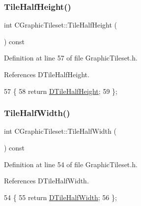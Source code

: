 \hypertarget{classCGraphicTileset_a958562733d2ac30643188503e774af32}{}\label{classCGraphicTileset_a958562733d2ac30643188503e774af32} 
\subsubsection{\texorpdfstring{Tile\+Half\+Height()}{TileHalfHeight()}}
{\footnotesize\ttfamily int C\+Graphic\+Tileset\+::\+Tile\+Half\+Height (\begin{DoxyParamCaption}{ }\end{DoxyParamCaption}) const\hspace{0.3cm}{\ttfamily [inline]}}



Definition at line 57 of file Graphic\+Tileset.\+h.



References D\+Tile\+Half\+Height.


\begin{DoxyCode}
57                                   \{
58             \textcolor{keywordflow}{return} \hyperlink{classCGraphicTileset_a16c8bc4e4c8738fe561b0408cd40ccef}{DTileHalfHeight};
59         \};
\end{DoxyCode}
\hypertarget{classCGraphicTileset_aa34a25f396f9684aebc5f73c45356ea5}{}\label{classCGraphicTileset_aa34a25f396f9684aebc5f73c45356ea5} 
\subsubsection{\texorpdfstring{Tile\+Half\+Width()}{TileHalfWidth()}}
{\footnotesize\ttfamily int C\+Graphic\+Tileset\+::\+Tile\+Half\+Width (\begin{DoxyParamCaption}{ }\end{DoxyParamCaption}) const\hspace{0.3cm}{\ttfamily [inline]}}



Definition at line 54 of file Graphic\+Tileset.\+h.



References D\+Tile\+Half\+Width.


\begin{DoxyCode}
54                                  \{
55             \textcolor{keywordflow}{return} \hyperlink{classCGraphicTileset_a3e82808009078ce29f6b74bcd077b251}{DTileHalfWidth};
56         \};
\end{DoxyCode}
\hypertarget{classCGraphicTileset_a42aa03d1183ea881ce9d7b5545b564f3}{}\label{classCGraphicTileset_a42aa03d1183ea881ce9d7b5545b564f3} 
